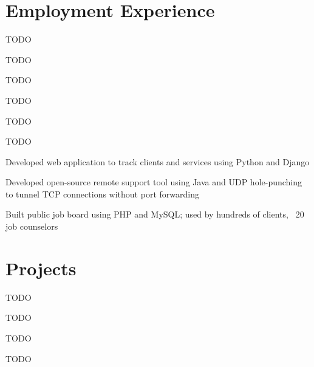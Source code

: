 \documentclass[]{deedy-resume-openfont}
\begin{document}
\begin{minipage}[t]{0.31\textwidth}
%
%

\end{minipage} 
\hfill
\begin{minipage}[t]{0.67\textwidth} 


\section{Employment Experience}
\vspace{\topsep} %
\begin{tightemize}
	\item TODO
	\item TODO
	\item TODO
	\item TODO
	\item TODO
	\item TODO
\end{tightemize}
\sectionsep

\begin{tightemize}
\item Developed web application to track clients and services using Python and Django
\end{tightemize}
\sectionsep

\begin{tightemize}
\item Developed open-source remote support tool using Java and UDP hole-punching to tunnel TCP connections without port forwarding
\item Built public job board using PHP and MySQL; used by hundreds of clients, ~20 job counselors
\end{tightemize}
\sectionsep

\section{Projects}

\begin{tightemize}
	\item TODO
	\item TODO
	\item TODO
	\item TODO
\end{tightemize}
\sectionsep


\end{minipage}
\end{document}
